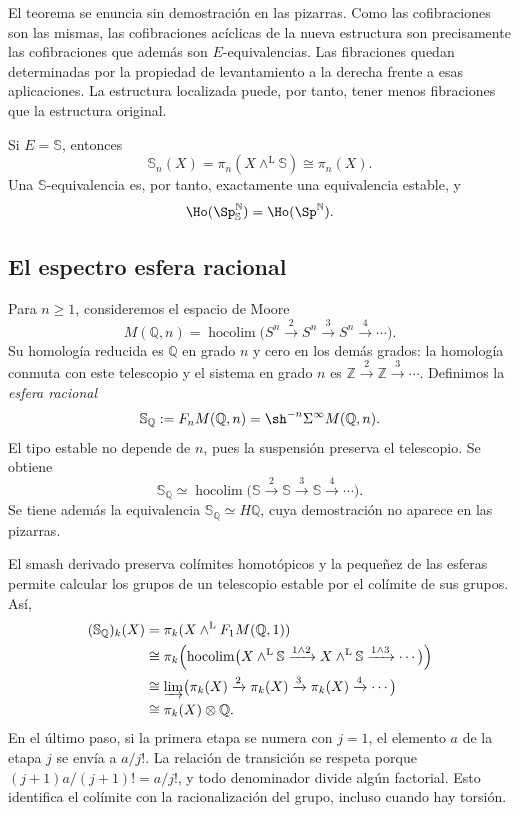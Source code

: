 El teorema se enuncia sin demostración en las pizarras. Como las cofibraciones son las mismas, las cofibraciones acíclicas de la nueva estructura son precisamente las cofibraciones que además son $E$-equivalencias. Las fibraciones quedan determinadas por la propiedad de levantamiento a la derecha frente a esas aplicaciones. La estructura localizada puede, por tanto, tener menos fibraciones que la estructura original.

Si $E=\mathbb S$, entonces
\[
\mathbb S_n(X)=\pi_n(X\wedge^{\mathrm L}\mathbb S)\cong\pi_n(X).
\]
Una $\mathbb S$-equivalencia es, por tanto, exactamente una equivalencia estable, y
\[
\Ho(\Sp_{\mathbb S}^{\mathbb N})=\Ho(\Sp^{\mathbb N}).
\]

\subsection{El espectro esfera racional}
Para $n\ge1$, consideremos el espacio de Moore
\[
M(\mathbb Q,n)=\operatorname*{hocolim}
\bigl(S^n\xrightarrow{\ 2\ }S^n\xrightarrow{\ 3\ }S^n
\xrightarrow{\ 4\ }\cdots\bigr).
\]
Su homología reducida es $\mathbb Q$ en grado $n$ y cero en los demás grados: la homología conmuta con este telescopio y el sistema en grado $n$ es $\mathbb Z\xrightarrow{2}\mathbb Z\xrightarrow{3}\cdots$. Definimos la \emph{esfera racional}
\[
\mathbb S_{\mathbb Q}:=F_nM(\mathbb Q,n)
=\sh^{-n}\Sigma^\infty M(\mathbb Q,n).
\]
El tipo estable no depende de $n$, pues la suspensión preserva el telescopio. Se obtiene
\[
\mathbb S_{\mathbb Q}\simeq
\operatorname*{hocolim}\bigl(\mathbb S\xrightarrow{2}\mathbb S
\xrightarrow{3}\mathbb S\xrightarrow{4}\cdots\bigr).
\]
Se tiene además la equivalencia $\mathbb S_{\mathbb Q}\simeq H\mathbb Q$, cuya demostración no aparece en las pizarras.

El smash derivado preserva colímites homotópicos y la pequeñez de las esferas permite calcular los grupos de un telescopio estable por el colímite de sus grupos. Así,
\[
\begin{aligned}
(\mathbb S_{\mathbb Q})_k(X)
&=\pi_k(X\wedge^{\mathrm L}F_1M(\mathbb Q,1))\\
&\cong\pi_k\Bigl(\operatorname*{hocolim}
\bigl(X\wedge^{\mathrm L}\mathbb S\xrightarrow{1\wedge2}
X\wedge^{\mathrm L}\mathbb S\xrightarrow{1\wedge3}\cdots\bigr)\Bigr)\\
&\cong\varinjlim\bigl(\pi_k(X)\xrightarrow{2}\pi_k(X)
\xrightarrow{3}\pi_k(X)\xrightarrow{4}\cdots\bigr)\\
&\cong\pi_k(X)\otimes\mathbb Q.
\end{aligned}
\]
En el último paso, si la primera etapa se numera con $j=1$, el elemento $a$ de la etapa $j$ se envía a $a/j!$. La relación de transición se respeta porque $(j+1)a/(j+1)!=a/j!$, y todo denominador divide algún factorial. Esto identifica el colímite con la racionalización del grupo, incluso cuando hay torsión.


